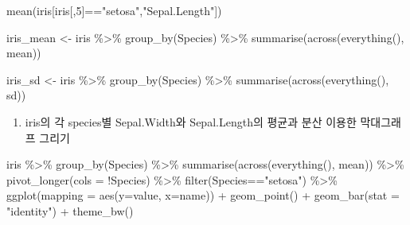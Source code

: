 \documentclass[
]{book}
\newenvironment{Shaded}{\begin{snugshade}}{\end{snugshade}}
\newcommand{\AttributeTok}[1]{\textcolor[rgb]{0.77,0.63,0.00}{#1}}
\newcommand{\DecValTok}[1]{\textcolor[rgb]{0.00,0.00,0.81}{#1}}
\newcommand{\FunctionTok}[1]{\textcolor[rgb]{0.00,0.00,0.00}{#1}}
\newcommand{\NormalTok}[1]{#1}
\newcommand{\OtherTok}[1]{\textcolor[rgb]{0.56,0.35,0.01}{#1}}
\newcommand{\SpecialCharTok}[1]{\textcolor[rgb]{0.00,0.00,0.00}{#1}}
\newcommand{\StringTok}[1]{\textcolor[rgb]{0.31,0.60,0.02}{#1}}
\providecommand{\tightlist}{%
  \setlength{\itemsep}{0pt}\setlength{\parskip}{0pt}}
\begin{document}
\begin{Shaded}
\begin{Highlighting}[]
\FunctionTok{mean}\NormalTok{(iris[iris[,}\DecValTok{5}\NormalTok{]}\SpecialCharTok{==}\StringTok{"setosa"}\NormalTok{,}\StringTok{"Sepal.Length"}\NormalTok{])}

\NormalTok{iris\_mean }\OtherTok{\textless{}{-}}\NormalTok{ iris }\SpecialCharTok{\%\textgreater{}\%}
  \FunctionTok{group\_by}\NormalTok{(Species) }\SpecialCharTok{\%\textgreater{}\%} 
  \FunctionTok{summarise}\NormalTok{(}\FunctionTok{across}\NormalTok{(}\FunctionTok{everything}\NormalTok{(), mean))}

\NormalTok{iris\_sd }\OtherTok{\textless{}{-}}\NormalTok{ iris }\SpecialCharTok{\%\textgreater{}\%}
  \FunctionTok{group\_by}\NormalTok{(Species) }\SpecialCharTok{\%\textgreater{}\%} 
  \FunctionTok{summarise}\NormalTok{(}\FunctionTok{across}\NormalTok{(}\FunctionTok{everything}\NormalTok{(), sd))}
\end{Highlighting}
\end{Shaded}

\begin{enumerate}
\def\labelenumi{\arabic{enumi}.}
\setcounter{enumi}{2}
\tightlist
\item
  iris의 각 species별 Sepal.Width와 Sepal.Length의 평균과 분산 이용한 막대그래프 그리기
\end{enumerate}

\begin{Shaded}
\begin{Highlighting}[]
\NormalTok{iris }\SpecialCharTok{\%\textgreater{}\%}
  \FunctionTok{group\_by}\NormalTok{(Species) }\SpecialCharTok{\%\textgreater{}\%} 
  \FunctionTok{summarise}\NormalTok{(}\FunctionTok{across}\NormalTok{(}\FunctionTok{everything}\NormalTok{(), mean)) }\SpecialCharTok{\%\textgreater{}\%} 
  \FunctionTok{pivot\_longer}\NormalTok{(}\AttributeTok{cols =} \SpecialCharTok{!}\NormalTok{Species) }\SpecialCharTok{\%\textgreater{}\%} 
  \FunctionTok{filter}\NormalTok{(Species}\SpecialCharTok{==}\StringTok{"setosa"}\NormalTok{) }\SpecialCharTok{\%\textgreater{}\%} 
  \FunctionTok{ggplot}\NormalTok{(}\AttributeTok{mapping =} \FunctionTok{aes}\NormalTok{(}\AttributeTok{y=}\NormalTok{value, }\AttributeTok{x=}\NormalTok{name)) }\SpecialCharTok{+}
  \FunctionTok{geom\_point}\NormalTok{() }\SpecialCharTok{+}
  \FunctionTok{geom\_bar}\NormalTok{(}\AttributeTok{stat =} \StringTok{"identity"}\NormalTok{) }\SpecialCharTok{+}
  \FunctionTok{theme\_bw}\NormalTok{()}
\end{Highlighting}
\end{Shaded}
\end{document}
